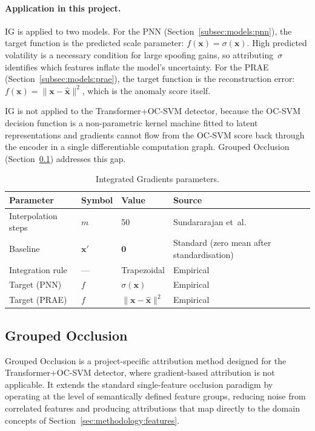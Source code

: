 \documentclass[11pt]{report}
\begin{document}
\paragraph{Application in this project.}
IG is applied to two models. For the PNN (Section~\ref{subsec:models:pnn}), the target function is the predicted scale parameter: $f(\mathbf{x}) = \sigma(\mathbf{x})$. High predicted volatility is a necessary condition for large spoofing gains, so attributing~$\sigma$ identifies which features inflate the model's uncertainty. For the PRAE (Section~\ref{subsec:models:prae}), the target function is the reconstruction error: $f(\mathbf{x}) = \| \mathbf{x} - \hat{\mathbf{x}} \|^2$, which is the anomaly score itself.

IG is not applied to the Transformer+OC-SVM detector, because the OC-SVM decision function is a non-parametric kernel machine fitted to latent representations and gradients cannot flow from the OC-SVM score back through the encoder in a single differentiable computation graph.
Grouped Occlusion (Section~\ref{sec:methodology:interp:occlusion}) addresses this gap.

\begin{table}[H]
\centering
\caption{Integrated Gradients parameters.}
\label{tab:ig_params}
\begin{tabular}{llll}
\toprule
\textbf{Parameter} & \textbf{Symbol} & \textbf{Value} & \textbf{Source} \\
\midrule
Interpolation steps & $m$ & 50 & Sundararajan et~al.~\cite{sundararajan2017axiomaticattributiondeepnetworks} \\
Baseline & $\mathbf{x}'$ & $\mathbf{0}$ & Standard (zero mean after standardisation) \\
Integration rule & --- & Trapezoidal & Empirical \\
Target (PNN) & $f$ & $\sigma(\mathbf{x})$ & Empirical \\
Target (PRAE) & $f$ & $\| \mathbf{x} - \hat{\mathbf{x}} \|^2$ & Empirical \\
\bottomrule
\end{tabular}
\end{table}


\subsection{Grouped Occlusion}\label{sec:methodology:interp:occlusion}

Grouped Occlusion is a project-specific attribution method designed for the Transformer+OC-SVM detector, where gradient-based attribution is not applicable. It extends the standard single-feature occlusion paradigm by operating at the level of semantically defined feature groups, reducing noise from correlated features and producing attributions that map directly to the domain concepts of Section~\ref{sec:methodology:features}.
\end{document}
